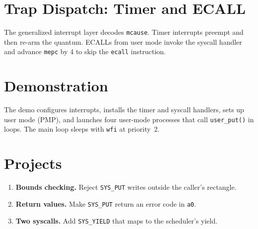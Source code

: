 \begin{figure}[H]
\centering

\end{figure}

\section{Trap Dispatch: Timer and ECALL}

The generalized interrupt layer decodes \texttt{mcause}. Timer interrupts preempt and then re-arm the quantum. ECALLs from user mode invoke the syscall handler and advance \texttt{mepc} by 4 to skip the \texttt{ecall} instruction.

\begin{figure}[H]
\centering

\end{figure}

\begin{figure}[H]
\centering

\end{figure}

\section{Demonstration}

The demo configures interrupts, installs the timer and syscall handlers, sets up user mode (PMP), and launches four user-mode processes that call \texttt{user\_put()} in loops. The main loop sleeps with \texttt{wfi} at priority~2.

\begin{figure}[H]
\centering

\end{figure}

\section*{Projects}
\begin{enumerate}
  \item \textbf{Bounds checking.} Reject \texttt{SYS\_PUT} writes outside the caller’s rectangle.
  \item \textbf{Return values.} Make \texttt{SYS\_PUT} return an error code in \texttt{a0}.
  \item \textbf{Two syscalls.} Add \texttt{SYS\_YIELD} that maps to the scheduler’s yield.
\end{enumerate}
